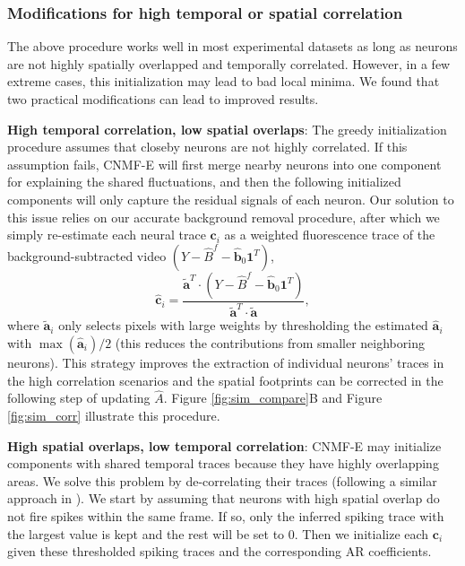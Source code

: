 \documentclass[9pt,lineno]{elife}
\begin{document}
\subsubsection{Modifications for high temporal or spatial correlation}
The above procedure works well in most experimental datasets as long as neurons are not highly spatially overlapped and temporally correlated. However, in a few extreme cases, this initialization may lead to bad local minima. We found that two practical modifications can lead to improved results.

\textbf{High temporal correlation, low spatial overlaps}: The greedy initialization procedure  assumes that closeby neurons are not highly correlated. If this assumption fails, CNMF-E will first merge nearby neurons into one component for explaining the shared fluctuations, and then the following initialized components will only capture the residual signals of each neuron. Our solution to this issue relies on our accurate background removal procedure, after which we simply re-estimate each neural trace $\bm{c}_i$ as a weighted fluorescence trace of the  background-subtracted video $(Y-\hat{B}^f-\hat{\bm{b}}_0\bm{1}^T)$, 
\begin{equation}
  \hat{\bm{c}}_i = \frac{\tilde{\bm{a}}^T\cdot (Y-\hat{B}^f-\hat{\bm{b}}_0\bm{1}^T)}{\tilde{\bm{a}}^T\cdot \tilde{\bm{a}}}, 
\end{equation}
where $\tilde{\bm{a}}_i$ only selects pixels with large weights by thresholding the estimated $\hat{\bm{a}}_i$  with $\max(\hat{\bm{a}}_i)/2$ (this reduces the contributions from smaller neighboring neurons). This strategy improves the extraction of individual neurons' traces in the high correlation scenarios and the spatial footprints can be corrected in the following step of updating $\hat{A}$. Figure \ref{fig:sim_compare}B and Figure \ref{fig:sim_corr} illustrate this procedure. 

\textbf{High spatial overlaps, low temporal correlation}: CNMF-E may initialize components with shared temporal traces because they have highly overlapping areas. We solve this problem by de-correlating their traces (following a similar approach in \citep{Pnevmatikakis2016}). We start by assuming that neurons with high spatial overlap do not fire spikes within the same frame. If so, only the inferred spiking trace with the largest value is kept and the rest will be set to 0. Then we initialize each $\bm{c}_i$ given these thresholded spiking traces and the corresponding AR coefficients. 
\end{document}
